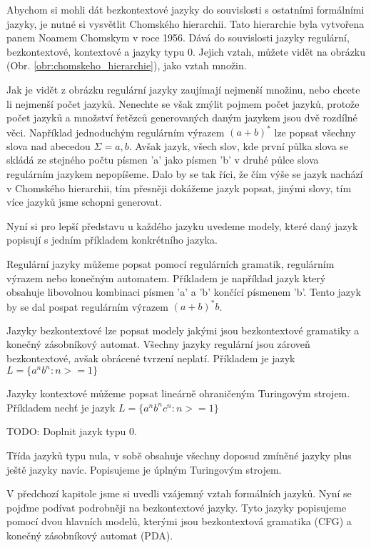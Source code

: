 Abychom si mohli dát bezkontextové jazyky do souvislosti s ostatními formálními jazyky, je nutné si vysvětlit Chomského hierarchii. Tato hierarchie byla vytvořena panem Noamem Chomskym v roce 1956. Dává do souvislosti jazyky regulární, bezkontextové, kontextové a jazyky typu 0. Jejich vztah, můžete vidět na obrázku (Obr. \ref{obr:chomskeho_hierarchie}), jako vztah množin.


Jak je vidět z obrázku regulární jazyky zaujímají nejmenší množinu, nebo chcete li nejmenší počet jazyků. Nenechte se však zmýlit pojmem  počet jazyků, protože počet jazyků a množství řetězců generovaných daným jazykem jsou dvě rozdílné věci. Například jednoduchým regulárním výrazem \( (a + b)^* \) lze popsat všechny slova nad abecedou \( \Sigma = {a, b} \). Avšak jazyk, všech slov, kde první půlka slova se skládá ze stejného počtu písmen 'a' jako písmen 'b' v druhé půlce slova regulárním jazykem nepopíšeme. Dalo by se tak říci, že čím výše se jazyk nachází v Chomského hierarchii, tím přesněji dokážeme jazyk popsat, jinými slovy, tím více jazyků jsme schopni generovat.

Nyní si pro lepší představu u každého jazyku uvedeme modely, které daný jazyk popisují s jedním příkladem konkrétního jazyka.

Regulární jazyky můžeme popsat pomocí regulárních gramatik, regulárním výrazem nebo konečným automatem. Příkladem je například jazyk který obsahuje libovolnou kombinaci písmen 'a' a 'b' končící písmenem 'b'. Tento jazyk by se dal pospat regulárním výrazem \( (a + b)^* b \). 

Jazyky bezkontextové lze popsat modely jakými jsou bezkontextové gramatiky a konečný zásobníkový automat. Všechny jazyky regulární jsou zároveň bezkontextové, avšak obrácené tvrzení neplatí. Příkladem je jazyk \( L = \{ a^n b^n : n >= 1 \}  \)

Jazyky kontextové můžeme popsat lineárně ohraničeným Turingovým strojem. Příkladem nechť je jazyk \( L = \{ a^n b^n c^n : n >= 1 \}  \)

TODO: Doplnit jazyk typu 0.

Třída jazyků typu nula, v sobě obsahuje všechny doposud zmíněné jazyky plus ještě jazyky navíc. Popisujeme je úplným Turingovým strojem. 
\cite{Chomsky_hierarchy}

V předchozí kapitole jsme si uvedli vzájemný vztah formálních jazyků. Nyní se pojďme podívat podrobněji na bezkontextové jazyky. Tyto jazyky popisujeme pomocí dvou hlavních modelů, kterými jsou bezkontextová gramatika (CFG) a konečný zásobníkový automat (PDA).

